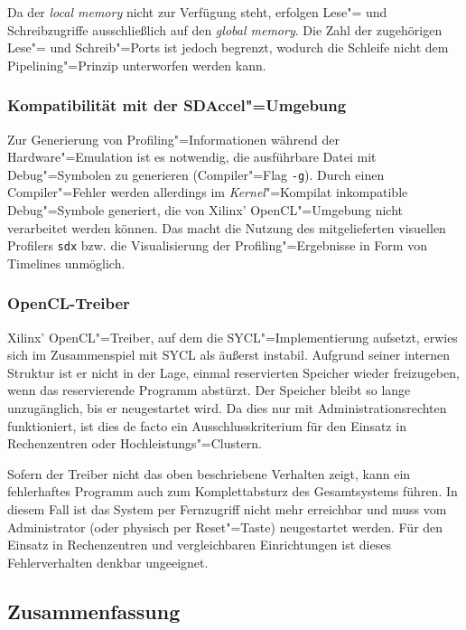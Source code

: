 Da der \textit{local memory} nicht zur Verfügung steht, erfolgen Lese"= und
Schreibzugriffe ausschließlich auf den \textit{global memory}. Die Zahl der
zugehörigen Lese"= und Schreib"=Ports ist jedoch begrenzt, wodurch die Schleife
nicht dem Pipelining"=Prinzip unterworfen werden kann.

\subsubsection{Kompatibilität mit der SDAccel"=Umgebung}

Zur Generierung von Profiling"=Informationen während der Hardware"=Emulation ist
es notwendig, die ausführbare Datei mit Debug"=Symbolen zu generieren
(Compiler"=Flag \texttt{-g}). Durch einen Compiler"=Fehler werden allerdings im
\textit{Kernel}"=Kompilat inkompatible Debug"=Symbole generiert, die von Xilinx'
OpenCL"=Umgebung nicht verarbeitet werden können. Das macht die Nutzung des
mitgelieferten visuellen Profilers \texttt{sdx} bzw. die Visualisierung der
Profiling"=Ergebnisse in Form von Timelines unmöglich.

\subsubsection{OpenCL-Treiber}

Xilinx' OpenCL"=Treiber, auf dem die SYCL"=Implementierung aufsetzt, erwies sich
im Zusammenspiel mit SYCL als äußerst instabil. Aufgrund seiner internen
Struktur ist er nicht in der Lage, einmal reservierten Speicher wieder
freizugeben, wenn das reservierende Programm abstürzt. Der Speicher bleibt so
lange unzugänglich, bis er neugestartet wird. Da dies nur mit
Administrationsrechten funktioniert, ist dies de facto ein Ausschlusskriterium
für den Einsatz in Rechenzentren oder Hochleistungs"=Clustern.

Sofern der Treiber nicht das oben beschriebene Verhalten zeigt, kann ein
fehlerhaftes Programm auch zum Komplettabsturz des Gesamtsystems führen. In
diesem Fall ist das System per Fernzugriff nicht mehr erreichbar und muss
vom Administrator (oder physisch per Reset"=Taste) neugestartet werden. Für den
Einsatz in Rechenzentren und vergleichbaren Einrichtungen ist dieses
Fehlerverhalten denkbar ungeeignet.

\subsection{Zusammenfassung}
 
